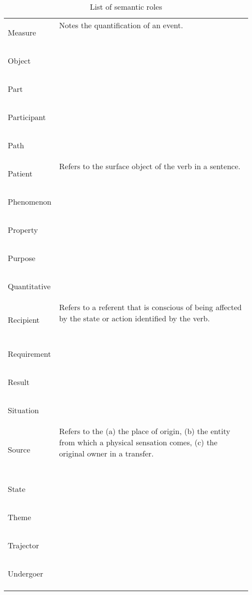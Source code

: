 \documentclass[a4paper,11pt, onecolumn,twoside]{article}
\begin{document}
\begin{longtable}{ p{}  p{} }
\midrule
 \multirow{2}{*}{Measure} & Notes the quantification of an event. \\ 
        & ~ \\
\midrule
 \multirow{2}{*}{Object} & ~ \\ 
        & ~ \\
\midrule
 \multirow{2}{*}{Part} & ~ \\ 
        & ~ \\
\midrule
 \multirow{2}{*}{Participant} & ~ \\ 
        & ~ \\
\midrule
 \multirow{2}{*}{Path} & ~ \\ 
        & ~ \\
\midrule
 \multirow{2}{*}{Patient} & Refers to the surface object of the verb in a sentence. \\ 
        & ~ \\
\midrule
 \multirow{2}{*}{Phenomenon} & ~ \\ 
        & ~ \\
\midrule
 \multirow{2}{*}{Property} & ~ \\ 
        & ~ \\
\midrule
 \multirow{2}{*}{Purpose} & ~ \\ 
        & ~ \\
\midrule
 \multirow{2}{*}{Quantitative} & ~ \\ 
        & ~ \\
\midrule
 \multirow{2}{*}{Recipient} & Refers to a referent that is conscious of being affected by the state or action identified by the verb. \\ 
        & ~ \\
\midrule
 \multirow{2}{*}{Requirement} & ~ \\ 
        & ~ \\
\midrule
 \multirow{2}{*}{Result} & ~ \\ 
        & ~ \\
\midrule
 \multirow{2}{*}{Situation} & ~ \\ 
        & ~ \\
\midrule
 \multirow{2}{*}{Source} & Refers to the (a) the place of origin, (b) the entity from which a physical sensation comes, (c) the original owner in a transfer. \\ 
        & ~ \\
\midrule
 \multirow{2}{*}{State} & ~ \\ 
        & ~ \\
\midrule
 \multirow{2}{*}{Theme} & ~ \\ 
        & ~ \\
\midrule
 \multirow{2}{*}{Trajector} & ~ \\ 
        & ~ \\
\midrule
 \multirow{2}{*}{Undergoer} & ~ \\ 
        & ~ \\
\bottomrule
\caption{List of semantic roles}
\label{table:semroles}
\end{longtable}
\end{document}
